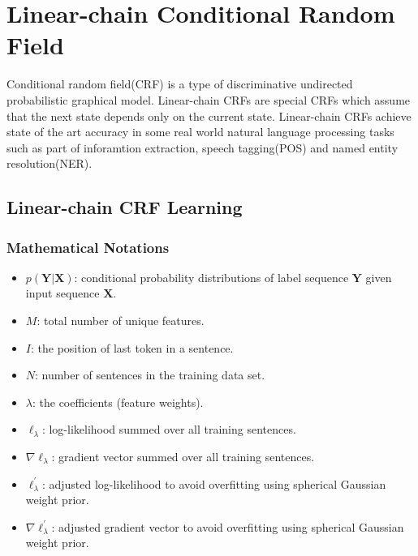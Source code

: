 
\chapter[Linear-chain Conditional Random Field]{Linear-chain Conditional Random Field}
Conditional random field(CRF) \cite{DBLP:conf/icml/LaffertyMP01} is a type of discriminative undirected probabilistic graphical model.
Linear-chain CRFs are special CRFs which assume that the next state depends only on the current state.
Linear-chain CRFs achieve state of the art accuracy in some real world natural language processing tasks such
as part of inforamtion extraction\cite{chen2012optimizing}, speech tagging(POS) and named entity resolution(NER).

\section{Linear-chain CRF Learning}

\subsection{Mathematical Notations}
\begin{itemize}
\item $p(\boldsymbol Y | \boldsymbol X)$: conditional probability distributions of label sequence $\boldsymbol Y$ given input sequence $\boldsymbol X$.
\item $M$: total number of unique features.
\item $I$: the position of last token in a sentence.
\item $N$: number of sentences in the training data set.
\item $\lambda$: the coefficients (feature weights).
\item $\ell_{\lambda}$: log-likelihood summed over all training sentences.
\item $\nabla \ell_{\lambda}$: gradient vector summed over all training sentences.
\item $\ell_{\lambda}^\prime$: adjusted log-likelihood to avoid overfitting using spherical Gaussian weight prior.
\item $\nabla \ell_{\lambda}^\prime$: adjusted gradient vector to avoid overfitting using spherical Gaussian weight prior.

\end{itemize}

